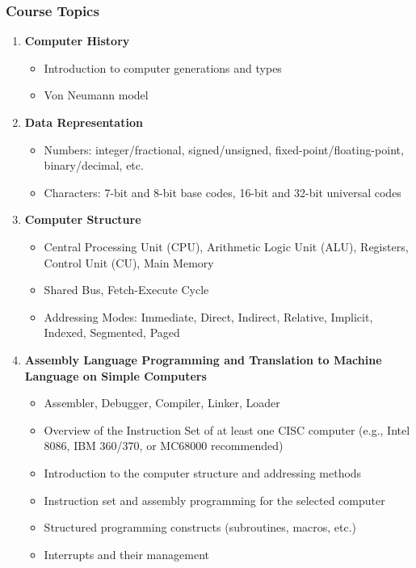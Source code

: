 \documentclass[12pt]{article}
\begin{document}
\subsubsection*{Course Topics}
\begin{enumerate}
    \item \textbf{Computer History}
    \begin{itemize}
        \item Introduction to computer generations and types
        \item Von Neumann model
    \end{itemize}
    \item \textbf{Data Representation}
    \begin{itemize}
        \item Numbers: integer/fractional, signed/unsigned, fixed-point/floating-point, binary/decimal, etc.
        \item Characters: 7-bit and 8-bit base codes, 16-bit and 32-bit universal codes
    \end{itemize}
    \item \textbf{Computer Structure}
    \begin{itemize}
        \item Central Processing Unit (CPU), Arithmetic Logic Unit (ALU), Registers, Control Unit (CU), Main Memory
        \item Shared Bus, Fetch-Execute Cycle
        \item Addressing Modes: Immediate, Direct, Indirect, Relative, Implicit, Indexed, Segmented, Paged
    \end{itemize}
    \item \textbf{Assembly Language Programming and Translation to Machine Language on Simple Computers}
    \begin{itemize}
        \item Assembler, Debugger, Compiler, Linker, Loader
        \item Overview of the Instruction Set of at least one CISC computer (e.g., Intel 8086, IBM 360/370, or MC68000 recommended)
        \item Introduction to the computer structure and addressing methods
        \item Instruction set and assembly programming for the selected computer
        \item Structured programming constructs (subroutines, macros, etc.)
        \item Interrupts and their management
    \end{itemize}

\end{enumerate}
\end{document}
